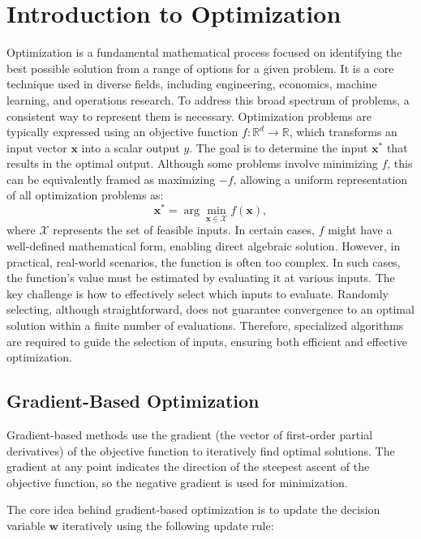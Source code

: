 \section{Introduction to Optimization}
\label{section:optimization_introduction}

Optimization is a fundamental mathematical process focused on identifying the best possible solution from a range of options for a given problem. It is a core technique used in diverse fields, including engineering, economics, machine learning, and operations research. To address this broad spectrum of problems, a consistent way to represent them is necessary. Optimization problems are typically expressed using an objective function \( f \colon \mathbb{R}^d \rightarrow \mathbb{R} \), which transforms an input vector \( \mathbf{x} \) into a scalar output \( y \). The goal is to determine the input \( \mathbf{x}^* \) that results in the optimal output. Although some problems involve minimizing \( f \), this can be equivalently framed as maximizing \( -f \), allowing a uniform representation of all optimization problems as:
\[
\mathbf{x}^* = \arg \min_{\mathbf{x} \in \mathcal{X}} f(\mathbf{x}),
\]
where \( \mathcal{X} \) represents the set of feasible inputs. In certain cases, \( f \) might have a well-defined mathematical form, enabling direct algebraic solution. However, in practical, real-world scenarios, the function is often too complex. In such cases, the function's value must be estimated by evaluating it at various inputs. The key challenge is how to effectively select which inputs to evaluate. Randomly selecting, although straightforward, does not guarantee convergence to an optimal solution within a finite number of evaluations. Therefore, specialized algorithms are required to guide the selection of inputs, ensuring both efficient and effective optimization.


\subsection{Gradient-Based Optimization}
\label{subsection:gradient_based_optimization}

\noindent Gradient-based methods use the gradient (the vector of first-order partial derivatives) of the objective function to iteratively find optimal solutions. The gradient at any point indicates the direction of the steepest ascent of the objective function, so the negative gradient is used for minimization.

The core idea behind gradient-based optimization is to update the decision variable $\mathbf{w}$ iteratively using the following update rule:

